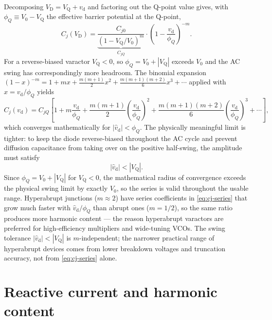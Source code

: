 \documentclass[12pt]{article}
\newcommand{\VD}{V_{\mathrm{D}}}
\newcommand{\VQ}{V_{\mathrm{Q}}}
\newcommand{\vd}{v_{\mathrm{d}}}
\newcommand{\vhd}{\hat{v}_{\mathrm{d}}}
\begin{document}
Decomposing $\VD = \VQ + \vd$ and factoring out the Q-point value gives, with $\phi_Q \equiv V_0 - \VQ$ the effective barrier potential at the Q-point,
\begin{equation}
C_j(\VD) = \underbrace{\frac{C_{j0}}{(1 - \VQ/V_0)^m}}_{\displaystyle C_{jQ}} \cdot \left(1 - \frac{\vd}{\phi_Q}\right)^{-m}.
\end{equation}
For a reverse-biased varactor $\VQ < 0$, so $\phi_Q = V_0 + |\VQ|$ exceeds $V_0$ and the AC swing has correspondingly more headroom. The binomial expansion $(1-x)^{-m} = 1 + mx + \tfrac{m(m+1)}{2}x^2 + \tfrac{m(m+1)(m+2)}{6}x^3 + \cdots$ applied with $x = \vd/\phi_Q$ yields
\begin{equation}
C_j(\vd) = C_{jQ}\left[ 1 + m\frac{\vd}{\phi_Q} + \frac{m(m+1)}{2}\left(\frac{\vd}{\phi_Q}\right)^{\!2} + \frac{m(m+1)(m+2)}{6}\left(\frac{\vd}{\phi_Q}\right)^{\!3} + \cdots\right],
\label{eq:cj-series}
\end{equation}
which converges mathematically for \mbox{$|\vhd| < \phi_Q$}. The physically meaningful limit is tighter: to keep the diode reverse-biased throughout the AC cycle and prevent diffusion capacitance from taking over on the positive half-swing, the amplitude must satisfy
\begin{equation}
|\vhd| < |\VQ|.
\label{eq:varactor-swing-limit}
\end{equation}
Since $\phi_Q = V_0 + |\VQ|$ for $\VQ < 0$, the mathematical radius of convergence exceeds the physical swing limit by exactly $V_0$, so the series is valid throughout the usable range. Hyperabrupt junctions ($m \approx 2$) have series coefficients in \eqref{eq:cj-series} that grow much faster with $\vhd/\phi_Q$ than abrupt ones ($m = 1/2$), so the same ratio produces more harmonic content --- the reason hyperabrupt varactors are preferred for high-efficiency multipliers and wide-tuning VCOs. The swing tolerance $|\vhd| < |\VQ|$ is $m$-independent; the narrower practical range of hyperabrupt devices comes from lower breakdown voltages and truncation accuracy, not from \eqref{eq:cj-series} alone.

\section*{Reactive current and harmonic content}
\end{document}
